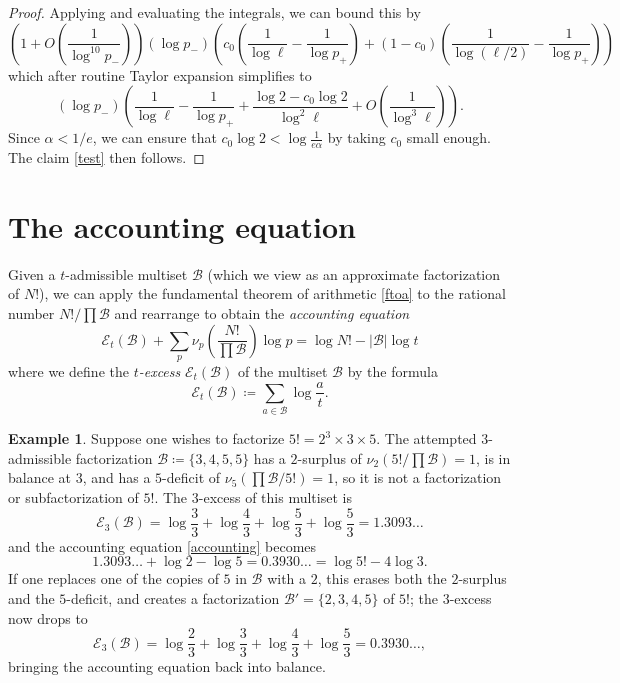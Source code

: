 \documentclass[12pt,a4paper,reqno]{amsart}
\numberwithin{equation}{section}
\theoremstyle{plain}
\theoremstyle{definition}
\newtheorem{example}[theorem]{Example}
\newcommand\tuple{{\mathcal B}}
\newcommand\excess{{\mathcal{E}}}
\begin{document}
\begin{proof}
Applying  and evaluating the integrals, we can bound this by
$$
\left( 1 + O\left(\frac{1}{\log^{10} p_-}\right)\right)
(\log p_-) \left( c_0 \left( \frac{1}{\log \ell} - \frac{1}{\log p_+} \right) + (1-c_0) \left( \frac{1}{\log(\ell/2)} - \frac{1}{\log p_+} \right) \right)$$
which after routine Taylor expansion simplifies to
$$ (\log p_-) \left(\frac{1}{\log \ell} - \frac{1}{\log p_+} + \frac{\log 2 - c_0 \log 2}{\log^2 \ell} + O\left( \frac{1}{\log^3 \ell}\right) \right).$$
Since $\alpha < 1/e$, we can ensure that $c_0 \log 2 < \log\frac{1}{e\alpha}$ by taking $c_0$ small enough.  The claim \eqref{test} then follows.
\end{proof}

\section{The accounting equation}\label{accounting-sec}

Given a $t$-admissible multiset $\tuple$ (which we view as an approximate factorization of $N!$), we can apply the fundamental theorem of arithmetic \eqref{ftoa} to the rational number  $N!/\prod \tuple$ and rearrange to obtain the \emph{accounting equation}
\begin{equation}\label{accounting} 
  \excess_t(\tuple) + \sum_p \nu_p\left( \frac{N!}{\prod \tuple} \right) \log p = \log N! - |\tuple| \log t
\end{equation}
where we define the \emph{$t$-excess} $\excess_t(\tuple)$ of the multiset $\tuple$ by the formula
\begin{equation}\label{excess-def}
  \excess_t(\tuple) \coloneqq \sum_{a \in \tuple} \log \frac{a}{t}.
\end{equation}

\begin{example} Suppose one wishes to factorize $5! = 2^3 \times 3 \times 5$.  The attempted $3$-admissible factorization $\tuple \coloneqq \{3,4,5,5\}$ has a $2$-surplus of $\nu_2(5!/\prod \tuple) = 1$, is in balance at $3$, and has a $5$-deficit of $\nu_5(\prod \tuple/5!) = 1$, so it is not a factorization or subfactorization of $5!$.  The $3$-excess of this multiset is
  $$ \excess_3(\tuple) = \log \frac{3}{3} + \log \frac{4}{3} + \log \frac{5}{3} + \log \frac{5}{3} = 1.3093\dots$$
  and the accounting equation \eqref{accounting} becomes
  $$ 1.3093\dots + \log 2 - \log 5 = 0.3930\dots = \log 5! - 4 \log 3.$$
  If one replaces one of the copies of $5$ in ${\mathcal B}$ with a $2$, this erases both the $2$-surplus and the $5$-deficit, and creates a factorization $\tuple' = \{2,3,4,5\}$ of $5!$; the $3$-excess now drops to
  $$ \excess_3(\tuple) = \log \frac{2}{3} + \log \frac{3}{3} + \log \frac{4}{3} + \log \frac{5}{3}  = 0.3930\dots,$$
  bringing the accounting equation back into balance.
\end{example}
  
\end{document}
